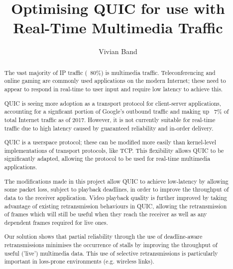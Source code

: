 \documentclass{mpaper}
\begin{document}
\title{Optimising QUIC for use with Real-Time Multimedia Traffic}
\author{Vivian Band}

\maketitle

\begin{abstract}
  The vast majority of IP traffic (~80\%) is multimedia traffic. Teleconferencing and online gaming are commonly used applications on the modern Internet; these need to appear to respond in real-time to user input and require low latency to achieve this.
  
  QUIC is seeing more adoption as a transport protocol for client-server applications, accounting for a signficant portion of Google's outbound traffic and making up ~7\% of total Internet traffic as of 2017. However, it is not currently suitable for real-time traffic due to high latency caused by guaranteed reliability and in-order delivery.
  
  QUIC is a userspace protocol; these can be modified more easily than kernel-level implementations of transport protocols, like TCP. This flexibility allows QUIC to be significantly adapted, allowing the protocol to be used for real-time multimedia applications.
  
  The modifications made in this project allow QUIC to achieve low-latency by allowing some packet loss, subject to playback deadlines, in order to improve the throughput of data to the receiver application. Video playback quality is further improved by taking advantage of existing retransmission behaviours in QUIC, allowing the retransmission of frames which will still be useful when they reach the receiver as well as any dependent frames required for live ones.
  
  Our solution shows that partial reliability through the use of deadline-aware retransmissions minimises the occurrence of stalls by improving the throughput of useful ('live') multimedia data. This use of selective retransmissions is particularly important in loss-prone environments (e.g. wireless links).
  

\end{abstract}

\end{document}
